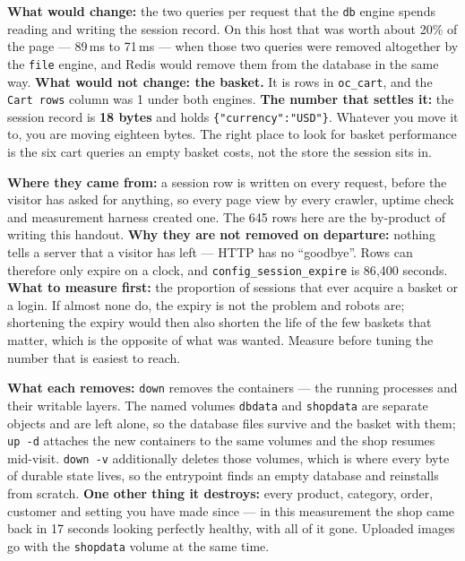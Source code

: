 \begin{ans}
  \item \textbf{What would change:} the two queries per request that the
        \texttt{db} engine spends reading and writing the session record. On
        this host that was worth about 20\% of the page --- 89\,ms to 71\,ms
        --- when those two queries were removed altogether by the
        \texttt{file} engine, and Redis would remove them from the database in
        the same way. \textbf{What would not change: the basket.} It is rows in
        \texttt{oc\_cart}, and the \texttt{Cart rows} column was 1 under both
        engines. \textbf{The number that settles it:} the session record is
        \textbf{18 bytes} and holds \texttt{\{"currency":"USD"\}}. Whatever you
        move it to, you are moving eighteen bytes. The right place to look for
        basket performance is the six cart queries an empty basket costs, not
        the store the session sits in.
  \item \textbf{Where they came from:} a session row is written on every
        request, before the visitor has asked for anything, so every page view
        by every crawler, uptime check and measurement harness created one. The
        645 rows here are the by-product of writing this handout.
        \textbf{Why they are not removed on departure:} nothing tells a server
        that a visitor has left --- HTTP has no ``goodbye''. Rows can therefore
        only expire on a clock, and \texttt{config\_session\_expire} is 86{,}400
        seconds. \textbf{What to measure first:} the proportion of sessions
        that ever acquire a basket or a login. If almost none do, the expiry is
        not the problem and robots are; shortening the expiry would then also
        shorten the life of the few baskets that matter, which is the opposite
        of what was wanted. Measure before tuning the number that is easiest
        to reach.
  \item \textbf{What each removes:} \texttt{down} removes the containers ---
        the running processes and their writable layers. The named volumes
        \texttt{dbdata} and \texttt{shopdata} are separate objects and are left
        alone, so the database files survive and the basket with them;
        \texttt{up -d} attaches the new containers to the same volumes and the
        shop resumes mid-visit. \texttt{down -v} additionally deletes those
        volumes, which is where every byte of durable state lives, so the
        entrypoint finds an empty database and reinstalls from scratch.
        \textbf{One other thing it destroys:} every product, category, order,
        customer and setting you have made since  --- in this
        measurement the shop came back in 17 seconds looking perfectly
        healthy, with all of it gone. Uploaded images go with the
        \texttt{shopdata} volume at the same time.
\end{ans}

